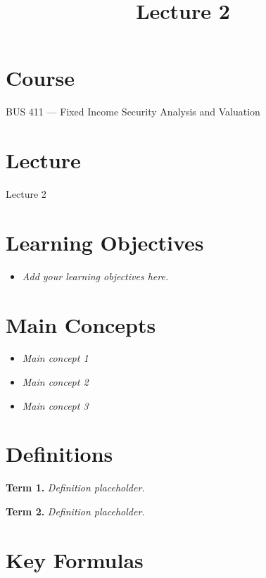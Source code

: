 \documentclass[
  letterpaper,
  DIV=11,
  numbers=noendperiod]{scrartcl}
\title{Lecture 2}
\author{}
\date{}
\providecommand{\tightlist}{%
  \setlength{\itemsep}{0pt}\setlength{\parskip}{0pt}}
\renewcommand*\contentsname{Table of contents}
\newcommand\contentsname{Table of contents}
\begin{document}
\maketitle

\renewcommand*\contentsname{Table of contents}
{
\hypersetup{linkcolor=}
\setcounter{tocdepth}{3}
\tableofcontents
}

\section{Course}\label{course}

BUS 411 --- Fixed Income Security Analysis and Valuation

\section{Lecture}\label{lecture}

Lecture 2

\section{Learning Objectives}\label{learning-objectives}

\begin{itemize}
\tightlist
\item
  \emph{Add your learning objectives here.}
\end{itemize}

\section{Main Concepts}\label{main-concepts}

\begin{itemize}
\tightlist
\item
  \emph{Main concept 1}
\item
  \emph{Main concept 2}
\item
  \emph{Main concept 3}
\end{itemize}

\section{Definitions}\label{definitions}

\textbf{Term 1.} \emph{Definition placeholder.}

\textbf{Term 2.} \emph{Definition placeholder.}

\section{Key Formulas}\label{key-formulas}
\end{document}
